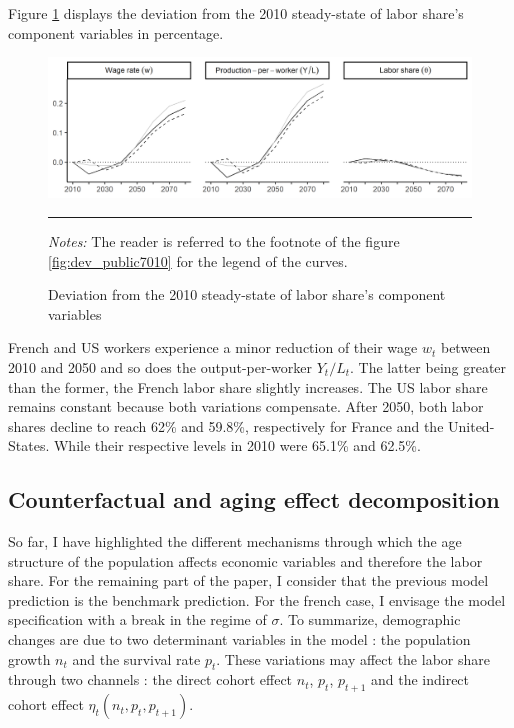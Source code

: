 Figure \ref{fig:dev_laborshare1080} displays the deviation from the 2010 steady-state of labor share's component variables in percentage.
\begin{figure}[tb]
	\centering
	\includegraphics[width=1\linewidth]{../result/deviation/dev_laborshare1080.png}
	\caption{Deviation from the 2010 steady-state of labor share's component variables}
	\label{fig:dev_laborshare1080}
	\vspace{.5ex}
	\hrule
	\vspace{-4ex}
	\justify\singlespacing\footnotesize \textit{Notes:} The reader is referred to the footnote of the figure \ref{fig:dev_public7010} for the legend of the curves.
\end{figure}
French and US workers experience a minor reduction of their wage $w_t$ between 2010 and 2050 and so does the output-per-worker $Y_t/L_t$. The latter being greater than the former, the French labor share slightly increases. The US labor share remains constant because both variations compensate. After 2050, both labor shares decline to reach 62\% and 59.8\%, respectively for France and the United-States. While their respective levels in 2010 were 65.1\% and 62.5\%.

\subsection{Counterfactual and aging effect decomposition} \label{subsec:counterfactual}

So far, I have highlighted the different mechanisms through which the age structure of the population affects economic variables and therefore the labor share. For the remaining part of the paper, I consider that the previous model prediction is the benchmark prediction. For the french case, I envisage the model specification with a break in the regime of $\sigma$. To summarize, demographic changes are due to two determinant variables in the model : the population growth $n_t$ and the survival rate $p_t$. These variations may affect the labor share through two channels : the direct cohort effect $n_t$, $p_t$, $p_{t+1}$ and the indirect cohort effect $\eta_t(n_t, p_t, p_{t+1})$.

